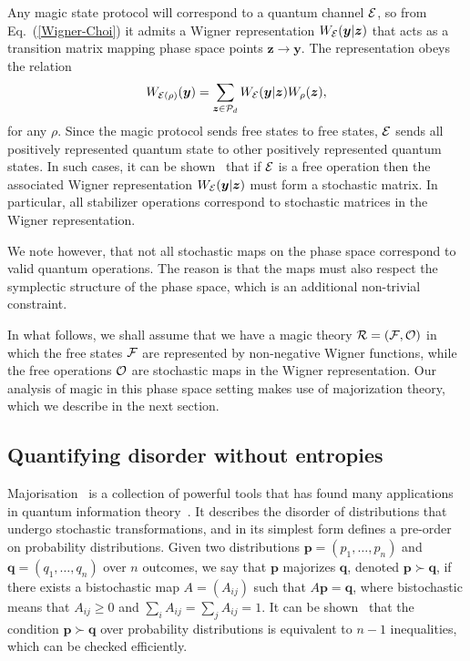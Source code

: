 \documentclass[
onecolumn,
superscriptaddress
]{revtex4-1}
\def\y{\boldsymbol{y}}
\def\z{\boldsymbol{z}}
\def\p{\boldsymbol{p}}
\def\q{\boldsymbol{q}}
\def\q{\boldsymbol{q}}
\def\E{{\cal E}}
\def\R{{\cal R}}
\def\F{{\cal F}}
\renewcommand{\O}{{\cal O}}
\renewcommand{\P}{{\cal P}}
\begin{document}
Any magic state protocol will correspond to a quantum channel $\E$, so from Eq.~(\ref{Wigner-Choi}) it admits a Wigner representation $W_{\E}(\y | \z)$ that acts as a transition matrix mapping phase space points $\z \rightarrow \y$. The representation obeys the relation 
\begin{equation}
	W_{\E(\rho)} (\y) = \sum_{\z \in \P_d} W_{\E}( \y | \z) W_\rho(\z),
\end{equation}
for any $\rho$. Since the magic protocol sends free states to free states, $\E$ sends all positively represented quantum state to other positively represented quantum states. In such cases, it can be shown~\cite{Wang_2019} that if $\E$ is a free operation then the associated Wigner representation $W_{\E}(\y |\z)$ must form a stochastic matrix. In particular, all stabilizer operations correspond to stochastic matrices in the Wigner representation. 

We note however, that not all stochastic maps on the phase space correspond to valid quantum operations. The reason is that the maps must also respect the symplectic structure of the phase space, which is an additional non-trivial constraint.

In what follows, we shall assume that we have a magic theory $\R = (\F, \O)$ in which the free states $\F$ are represented by non-negative Wigner functions, while the free operations $\O$ are stochastic maps in the Wigner representation. Our analysis of magic in this phase space setting makes use of majorization theory, which we describe in the next section.



\subsection*{Quantifying disorder without entropies}

Majorisation~\cite{cit:marshall, Blackwell_1953} is a collection of powerful tools that has found many applications in quantum information theory~\cite{Nielsen_1999, cit:cwiklinski, cit:lostaglio2, cit:gour, cit:gour2, Horodecki_2003, Puchala_2013, Vallejos_2021}.
It describes the disorder of distributions that undergo stochastic transformations, and in its simplest form defines a pre-order on probability distributions. Given two distributions $\p= (p_1, \dots, p_n)$ and $\q = (q_1, \dots, q_n)$ over $n$ outcomes, we say that $\p$ majorizes $\q$, denoted $\p \succ \q$, if there exists a bistochastic map $A = (A_{ij})$ such that $A\p = \q$, where bistochastic means that $A_{ij} \geq 0$ and $\sum_i A_{ij} = \sum_j A_{ij} = 1$. It can be shown~\cite{cit:marshall} that the condition $ \p \succ \q$ over probability distributions is equivalent to $n-1$ inequalities, which can be checked efficiently.
\end{document}
